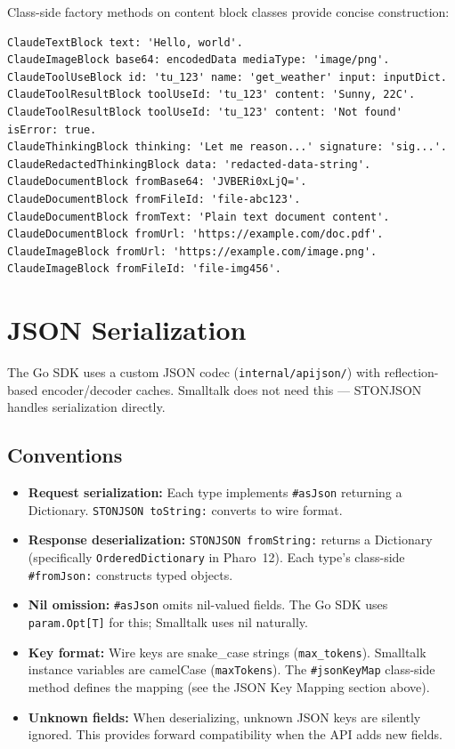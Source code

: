 \documentclass[a4paper,10pt,fleqn]{article}
\newcommand{\sel}[1]{\texttt{\##1}}
\begin{document}
Class-side factory methods on content block classes provide concise construction:

\begin{lstlisting}[language={},title={Helper constructors}]
ClaudeTextBlock text: 'Hello, world'.
ClaudeImageBlock base64: encodedData mediaType: 'image/png'.
ClaudeToolUseBlock id: 'tu_123' name: 'get_weather' input: inputDict.
ClaudeToolResultBlock toolUseId: 'tu_123' content: 'Sunny, 22C'.
ClaudeToolResultBlock toolUseId: 'tu_123' content: 'Not found' isError: true.
ClaudeThinkingBlock thinking: 'Let me reason...' signature: 'sig...'.
ClaudeRedactedThinkingBlock data: 'redacted-data-string'.
ClaudeDocumentBlock fromBase64: 'JVBERi0xLjQ='.
ClaudeDocumentBlock fromFileId: 'file-abc123'.
ClaudeDocumentBlock fromText: 'Plain text document content'.
ClaudeDocumentBlock fromUrl: 'https://example.com/doc.pdf'.
ClaudeImageBlock fromUrl: 'https://example.com/image.png'.
ClaudeImageBlock fromFileId: 'file-img456'.
\end{lstlisting}

\section{JSON Serialization}

The Go SDK uses a custom JSON codec (\texttt{internal/apijson/}) with
reflection-based encoder/decoder caches.  Smalltalk does not need this
--- STONJSON handles serialization directly.

\subsection{Conventions}

\begin{itemize}
  \item \textbf{Request serialization:} Each type implements \sel{asJson}
    returning a Dictionary.  \texttt{STONJSON toString:} converts to
    wire format.
  \item \textbf{Response deserialization:} \texttt{STONJSON fromString:}
    returns a Dictionary (specifically \texttt{OrderedDictionary} in
    Pharo~12).  Each type's class-side \sel{fromJson:} constructs
    typed objects.
  \item \textbf{Nil omission:} \sel{asJson} omits nil-valued fields.
    The Go SDK uses \texttt{param.Opt[T]} for this; Smalltalk uses nil
    naturally.
  \item \textbf{Key format:} Wire keys are snake\_case strings
    (\texttt{max\_tokens}).  Smalltalk instance variables are camelCase
    (\texttt{maxTokens}).  The \sel{jsonKeyMap} class-side method defines
    the mapping (see the JSON Key Mapping section above).
  \item \textbf{Unknown fields:} When deserializing, unknown JSON keys are
    silently ignored.  This provides forward compatibility when the API adds
    new fields.
\end{itemize}
\end{document}

